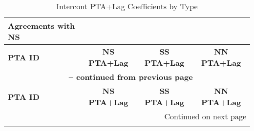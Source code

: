 \begin{center}
\small
\begin{longtable}{lccc}
    \caption{Intercont PTA+Lag Coefficients by Type} \label{tab:intercontinental_pta} \\

    \hline
    \textbf{Agreements with NS} &  &  &  \\
    \hline
    \textbf{PTA ID} & \textbf{NS PTA+Lag} & \textbf{SS PTA+Lag} & \textbf{NN PTA+Lag} \\
    \hline
    \endfirsthead
    
    \multicolumn{4}{c}{{\bfseries \tablename\ \thetable{} -- continued from previous page}} \\
    \hline
    \textbf{PTA ID} & \textbf{NS PTA+Lag} & \textbf{SS PTA+Lag} & \textbf{NN PTA+Lag} \\
    \hline
    \endhead
    
    \hline \multicolumn{4}{r}{{Continued on next page}} \\ \hline
    \endfoot
    
    \hline
    \endlastfoot
    

\end{longtable}
\end{center}
